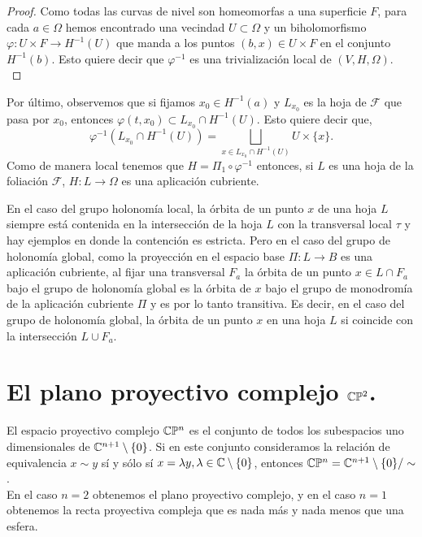 \begin{proof}
Como todas las curvas de nivel son homeomorfas a una superficie $F$, para cada $a\in\Omega$ hemos encontrado una vecindad $U\subset\Omega$ y un biholomorfismo $\varphi\colon U\times F\rightarrow H^{-1}(U)$ que manda a los puntos $(b,x)\in U\times F$ en el conjunto $H^{-1}(b)$. Esto quiere decir que $\varphi^{-1}$ es una trivialización local de $(V,H,\Omega)$.\\
\end{proof}

\noindent Por último, observemos que si fijamos $x_{0}\in H^{-1}(a)$ y $L_{x_{0}}$ es la hoja de $\mathcal{F}$ que pasa por $x_{0}$, entonces $\varphi(t,x_{0})\subset L_{x_{0}}\cap H^{-1}(U)$. Esto quiere decir que,
$$\varphi^{-1}(L_{x_{0}}\cap H^{-1}(U))=\bigsqcup_{x\in L_{x_{0}}\cap H^{-1}(U)}U\times \{x\}.$$ Como de manera local tenemos que $H=\Pi_{1}\circ \varphi^{-1}$ entonces, si $L$ es una hoja de la foliación $\mathcal{F}$, $H\colon L\rightarrow \Omega$ es una aplicación cubriente.

\begin{Obs}
\label{Obs:Interseccion}
En el caso del grupo holonomía local, la órbita de un punto $x$ de una hoja $L$ siempre está contenida en la intersección de la hoja $L$ con la transversal local $\tau$ y hay ejemplos en donde la contención es estricta. Pero en el caso del grupo de holonomía global, como la proyección en el espacio base $\Pi\colon L\rightarrow B$ es una aplicación cubriente, al fijar una transversal $F_{a}$ la órbita de un punto $x\in L\cap F_{a}$ bajo el grupo de holonomía global es la órbita de $x$ bajo el grupo de monodromía de la aplicación cubriente $\Pi$ y es por lo tanto transitiva. Es decir, en el caso del grupo de holonomía global, la órbita de un punto $x$ en una hoja $L$ si coincide con la intersección $L\cup F_{a}$.  
\end{Obs}

\section{El plano proyectivo complejo $\mathbb{C}\mathbb{P}^{2}$.}

El espacio proyectivo complejo $\mathbb{C}\mathbb{P}^{n}$ es el conjunto de todos los subespacios uno dimensionales de $\mathbb{C}^{n+1}\setminus\{0\}$. Si en este conjunto consideramos la relación de equivalencia $x\sim y$ sí y sólo sí $x=\lambda y, \lambda\in\mathbb{C}\setminus\{0\}$, entonces $\mathbb{C}\mathbb{P}^{n} = \mathbb{C}^{n+1}\setminus\{0\} / \sim$.\\

En el caso $n=2$ obtenemos el plano proyectivo complejo, y en el caso $n=1$ obtenemos la recta proyectiva compleja que es nada más y nada menos que una esfera.\\

